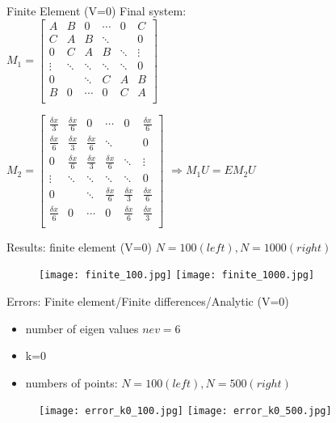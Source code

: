 \documentclass{beamer}
\begin{document}
\begin{frame}{Finite Element (V=0)}
    Final system: \\
    $M_1 = \begin{bmatrix}
A  & B     & 0      &  \cdots      & 0     & C  \\
C  & A     & B      & \ddots &       & 0 \\
0 & C & A & B & \ddots &  \vdots  \\
\vdots   & \ddots & \ddots & \ddots & \ddots & 0  \\
0  &        & \ddots & C & A & B \\
B & 0      &   \cdots     & 0     & C      & A \\
\end{bmatrix}$

$M_2 = \begin{bmatrix}
\frac{\delta x}{3}  & \frac{\delta x}{6}    & 0      &  \cdots      & 0     & \frac{\delta x}{6} \\
\frac{\delta x}{6}  & \frac{\delta x}{3}      & \frac{\delta x}{6}      & \ddots &       & 0 \\
0 & \frac{\delta x}{6} & \frac{\delta x}{3} & \frac{\delta x}{6} & \ddots &  \vdots  \\
\vdots   & \ddots & \ddots & \ddots & \ddots & 0  \\
0  &        & \ddots & \frac{\delta x}{6} & \frac{\delta x}{3} & \frac{\delta x}{6} \\
\frac{\delta x}{6} & 0      &   \cdots     & 0     & \frac{\delta x}{6}      & \frac{\delta x}{3}  \\
\end{bmatrix} 
$ $\Longrightarrow M_1U = EM_2U$
\end{frame}
\begin{frame}{Results: finite element (V=0)}
$N=100(left), N=1000 (right)$
 \begin{figure}
    \texttt{[image: finite\_100.jpg]} 
    \texttt{[image: finite\_1000.jpg]}
\end{figure}   
\end{frame}


\begin{frame}{Errors: Finite element/Finite differences/Analytic (V=0)}
\begin{itemize}
    \item number of eigen values $nev = 6$
    \item k=0
    \item numbers of points: $N = 100(left) , N=500(right)$ 
\end{itemize}

 \begin{figure}
    \texttt{[image: error\_k0\_100.jpg]} 
    \texttt{[image: error\_k0\_500.jpg]}
\end{figure} 
\end{frame}
\end{document}
